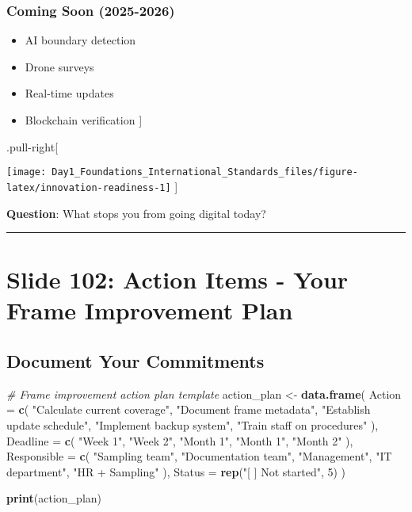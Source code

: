 \documentclass[
]{article}
\newenvironment{Shaded}{\begin{snugshade}}{\end{snugshade}}
\newcommand{\AttributeTok}[1]{\textcolor[rgb]{0.13,0.29,0.53}{#1}}
\newcommand{\CommentTok}[1]{\textcolor[rgb]{0.56,0.35,0.01}{\textit{#1}}}
\newcommand{\DecValTok}[1]{\textcolor[rgb]{0.00,0.00,0.81}{#1}}
\newcommand{\FunctionTok}[1]{\textcolor[rgb]{0.13,0.29,0.53}{\textbf{#1}}}
\newcommand{\NormalTok}[1]{#1}
\newcommand{\OtherTok}[1]{\textcolor[rgb]{0.56,0.35,0.01}{#1}}
\newcommand{\StringTok}[1]{\textcolor[rgb]{0.31,0.60,0.02}{#1}}
\providecommand{\tightlist}{%
  \setlength{\itemsep}{0pt}\setlength{\parskip}{0pt}}
\begin{document}
\subsubsection{Coming Soon (2025-2026)}\label{coming-soon-2025-2026}

\begin{itemize}
\tightlist
\item
  AI boundary detection
\item
  Drone surveys
\item
  Real-time updates
\item
  Blockchain verification {]}
\end{itemize}

.pull-right{[}

\texttt{[image: Day1\_Foundations\_International\_Standards\_files/figure-latex/innovation-readiness-1]}
{]}

\textbf{Question}: What stops you from going digital today?

\begin{center}\rule{0.5\linewidth}{0.5pt}\end{center}

\section{Slide 102: Action Items - Your Frame Improvement
Plan}\label{slide-102-action-items---your-frame-improvement-plan}

\subsection{Document Your Commitments}\label{document-your-commitments}

\begin{Shaded}
\begin{Highlighting}[]
\CommentTok{\# Frame improvement action plan template}
\NormalTok{action\_plan }\OtherTok{\textless{}{-}} \FunctionTok{data.frame}\NormalTok{(}
  \AttributeTok{Action =} \FunctionTok{c}\NormalTok{(}
    \StringTok{"Calculate current coverage"}\NormalTok{,}
    \StringTok{"Document frame metadata"}\NormalTok{, }
    \StringTok{"Establish update schedule"}\NormalTok{,}
    \StringTok{"Implement backup system"}\NormalTok{,}
    \StringTok{"Train staff on procedures"}
\NormalTok{  ),}
  \AttributeTok{Deadline =} \FunctionTok{c}\NormalTok{(}
    \StringTok{"Week 1"}\NormalTok{,}
    \StringTok{"Week 2"}\NormalTok{,}
    \StringTok{"Month 1"}\NormalTok{,}
    \StringTok{"Month 1"}\NormalTok{, }
    \StringTok{"Month 2"}
\NormalTok{  ),}
  \AttributeTok{Responsible =} \FunctionTok{c}\NormalTok{(}
    \StringTok{"Sampling team"}\NormalTok{,}
    \StringTok{"Documentation team"}\NormalTok{,}
    \StringTok{"Management"}\NormalTok{,}
    \StringTok{"IT department"}\NormalTok{,}
    \StringTok{"HR + Sampling"}
\NormalTok{  ),}
  \AttributeTok{Status =} \FunctionTok{rep}\NormalTok{(}\StringTok{"[ ] Not started"}\NormalTok{, }\DecValTok{5}\NormalTok{)}
\NormalTok{)}

\FunctionTok{print}\NormalTok{(action\_plan)}
\end{Highlighting}
\end{Shaded}
\end{document}

